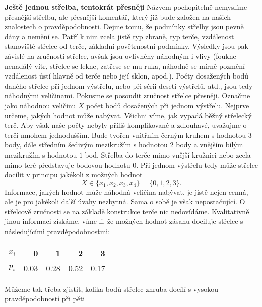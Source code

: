 \wikitextrule
\begin{example}\label{mai:exam064}
  \textbf{Ještě jednou střelba, tentokrát přesněji}\newline\small
  Názvem pochopitelně nemyslíme přesnější střelbu, ale přesnější komentář, který již bude založen 
  na našich znalostech o pravděpodobnosti. Dejme tomu, že podmínky střelby jsou pevně dány a nemění 
  se. Patří k nim zcela jistě typ zbraně, typ terče, vzdálenost stanoviště střelce od terče, 
  základní povětrnostní podmínky. Výsledky jsou pak závislé na zručnosti střelce, avšak jsou 
  ovlivněny náhodným i vlivy (foukne nenadálý vítr, střelec se lekne, zatřese se mu ruka, náhodně 
  se mírně pozmění vzdálenost ústí hlavně od terče nebo její sklon, apod.). Počty dosažených bodů 
  daného střelce při jednom výstřelu, nebo při sérii deseti výstřelů, atd., jsou tedy náhodnými
  veličinami. Pokusme se posoudit zručnost střelce přesněji. Označme jako náhodnou veličinu \(X\) 
  počet bodů dosažených při jednom výstřelu. Nejprve určeme, jakých hodnot může nabývat. Všichni 
  víme, jak vypadá běžný střelecký terč. Aby však naše počty nebyly příliš komplikované a 
  zdlouhavé, uvažujme o terči mnohem jednodušším. Bude tvořen vnitřním černým kruhem s hodnotou 
  \(3\) body, dále středním šedivým mezikružím s hodnotou \(2\) body a vnějším bílým mezikružím s 
  hodnotou \(1\) bod. Střelba do terče mimo vnější kružnici nebo zcela mimo terč představuje 
  bodovou hodnotu \(0\). Při jednom výstřelu tedy může střelec docílit v principu jakékoli z 
  možných hodnot
  \begin{equation*}
    X\in\{x_1, x_2, x_3,x_4\} = \{0,1,2,3\}.
  \end{equation*}
  Informace, jakých hodnot může náhodná veličina nabývat, je jistě nejen cenná, ale je pro jakékoli 
  další úvahy nezbytná. Sama o sobě je však nepostačující. O střelcově zručnosti se na základě 
  konstrukce terče nic nedovídáme. Kvalitativně jinou informaci získáme, víme-li, že možných hodnot 
  zásahu dociluje střelec s následujícími pravděpodobnostmi:
  \begin{table}[h]
    \centering
    \begin{tabular}{c|rrrr}
      \(x_i\)    &      0     &      1     &      2     &      3       \\ \hline
      \(p_i\)    & \num{0.03} & \num{0.28} & \num{0.52} & \num{0.17} 
    \end{tabular}
  \end{table}
  Můžeme tak třeba zjistit, kolika bodů střelec zhruba docílí s vysokou pravděpodobností při pěti 

\end{example}

